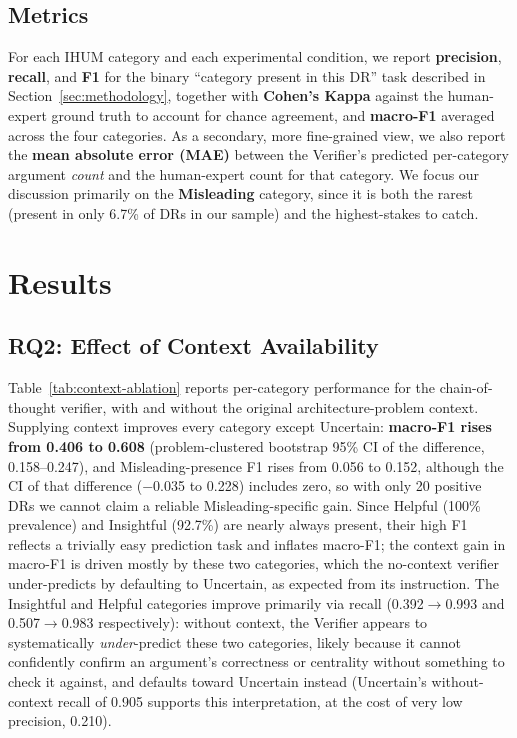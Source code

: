 \documentclass[runningheads]{llncs}
\begin{document}
\subsection{Metrics}
For each IHUM category and each experimental condition, we report \textbf{precision}, \textbf{recall}, and \textbf{F1} for the binary ``category present in this DR'' task described in Section~\ref{sec:methodology}, together with \textbf{Cohen's Kappa} against the human-expert ground truth to account for chance agreement, and \textbf{macro-F1} averaged across the four categories. As a secondary, more fine-grained view, we also report the \textbf{mean absolute error (MAE)} between the Verifier's predicted per-category argument \emph{count} and the human-expert count for that category. We focus our discussion primarily on the \textbf{Misleading} category, since it is both the rarest (present in only 6.7\% of DRs in our sample) and the highest-stakes to catch.


\section{Results}
\label{sec:results}

\subsection{RQ2: Effect of Context Availability}
Table~\ref{tab:context-ablation} reports per-category performance for the chain-of-thought verifier, with and without the original architecture-problem context. Supplying context improves every category except Uncertain: \textbf{macro-F1 rises from 0.406 to 0.608} (problem-clustered bootstrap 95\% CI of the difference, 0.158--0.247), and Misleading-presence F1 rises from 0.056 to 0.152, although the CI of that difference ($-$0.035 to 0.228) includes zero, so with only 20 positive DRs we cannot claim a reliable Misleading-specific gain. Since Helpful (100\% prevalence) and Insightful (92.7\%) are nearly always present, their high F1 reflects a trivially easy prediction task and inflates macro-F1; the context gain in macro-F1 is driven mostly by these two categories, which the no-context verifier under-predicts by defaulting to Uncertain, as expected from its instruction. The Insightful and Helpful categories improve primarily via recall (0.392$\rightarrow$0.993 and 0.507$\rightarrow$0.983 respectively): without context, the Verifier appears to systematically \emph{under}-predict these two categories, likely because it cannot confidently confirm an argument's correctness or centrality without something to check it against, and defaults toward Uncertain instead (Uncertain's without-context recall of 0.905 supports this interpretation, at the cost of very low precision, 0.210).
\end{document}
